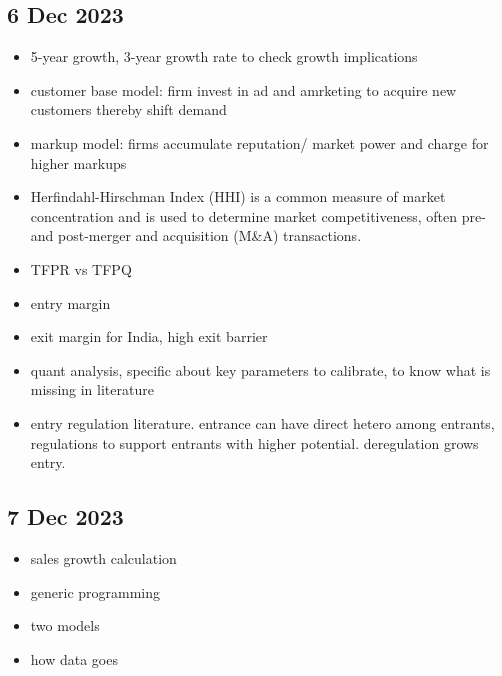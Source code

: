 	\subsection{6 Dec 2023}
		\begin{itemize}
			\item 5-year growth, 3-year growth rate to check growth implications
			\item customer base model: firm invest in ad and amrketing to acquire new customers thereby shift demand
			\item markup model: firms accumulate reputation/ market power and charge for higher markups
			\item Herfindahl-Hirschman Index (HHI) is a common measure of market concentration and is used to determine market competitiveness, often pre- and post-merger and acquisition (M\&A) transactions.
			\item TFPR vs TFPQ
			\item entry margin
			\item exit margin for India, high exit barrier
			\item quant analysis, specific about key parameters to calibrate, to know what is missing in literature
			\item entry regulation literature. entrance can have direct hetero among entrants, regulations to support entrants with higher potential. deregulation grows entry.
		\end{itemize}
		
	\subsection{7 Dec 2023}
		\begin{itemize}
			\item sales growth  calculation
			\item generic programming
			\item two models
			\item how data goes
		\end{itemize}
\newpage

\footnotesize



